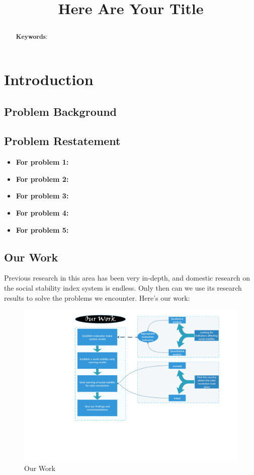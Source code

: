 \documentclass[12pt]{article}  %
\title{\begin{center} 
\textbf{{\Huge {\sc Here Are Your Title}}}
\end{center}}  %
\begin{document}
\begin{abstract}

    
    \vspace{5pt}
    \textbf{Keywords}:

\end{abstract}

\maketitle  %
\tableofcontents  %


\section{Introduction}
\subsection{Problem Background}

\subsection{Problem Restatement}
\begin{itemize}
\item \textbf{For problem 1:}
\item \textbf{For problem 2:} 
\item \textbf{For problem 3:}
\item \textbf{For problem 4:} 
\item \textbf{For problem 5:} 
\end{itemize}
\subsection{Our Work}
Previous research in this area has been very in-depth, and domestic research on the social stability index system is endless. Only then can we use its research results to solve the problems we encounter. Here's our work:

{\LARGE\CheckedBox} 

{\LARGE\CheckedBox} 

{\LARGE\CheckedBox} 
\begin{figure}[htbp]
\centering
\includegraphics[width=.4\textwidth]{img/our work.pdf}
\caption{Our Work}
\end{figure}
\end{document}

